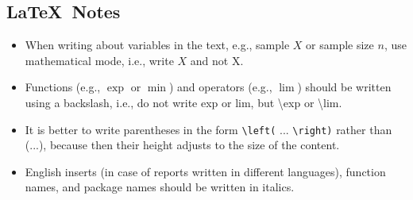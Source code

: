 \documentclass[12pt, a4paper]{article}\usepackage[]{graphicx}\usepackage[]{xcolor}
\begin{document}
\subsection{\LaTeX\ Notes}
\begin{itemize}
    \item 
When writing about variables in the text, e.g., sample $X$ or sample size $n$, use mathematical mode, i.e., write $X$ and not X.
    \item 
Functions (e.g., $\exp$ or $\min$) and operators (e.g., $\lim$) should be written using a backslash, i.e., do not write exp or lim, but \textbackslash exp or \textbackslash lim.
    \item 
It is better to write parentheses in the form \texttt{\textbackslash left(} ... \texttt{\textbackslash right)} rather than (...), because then their height adjusts to the size of the content.
\item 
English inserts (in case of reports written in different languages), function names, and package names should be written in italics.
\end{itemize}
\end{document}
